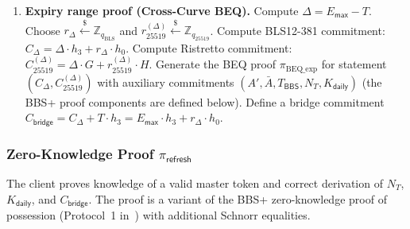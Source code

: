 \documentclass[11pt]{article}
\theoremstyle{definitionstyle}
\theoremstyle{plain}
\begin{document}
\begin{enumerate}[leftmargin=*]
\item \textbf{Expiry range proof (Cross-Curve BEQ).}
  Compute $\Delta = E_{\mathsf{max}} - T$.
  Choose $r_{\Delta} \xleftarrow{\$} \mathbb{Z}_{q_{\text{BLS}}}$ and $r_{25519}^{(\Delta)} \xleftarrow{\$} \mathbb{Z}_{q_{25519}}$.
  Compute BLS12-381 commitment: $C_{\Delta} = \Delta \cdot h_3 + r_{\Delta} \cdot h_0$.
  Compute Ristretto commitment: $C_{25519}^{(\Delta)} = \Delta \cdot G + r_{25519}^{(\Delta)} \cdot H$.
  Generate the BEQ proof $\pi_{\text{BEQ\_exp}}$ for statement $(C_{\Delta}, C_{25519}^{(\Delta)})$ with auxiliary commitments $(A', \bar{A}, T_{\mathsf{BBS}}, N_T, K_{\mathsf{daily}})$ (the BBS+ proof components are defined below).
  Define a bridge commitment $C_{\mathsf{bridge}} = C_{\Delta} + T \cdot h_3 = E_{\mathsf{max}} \cdot h_3 + r_{\Delta} \cdot h_0$.
\end{enumerate}

\subsubsection{Zero-Knowledge Proof $\pi_{\mathsf{refresh}}$}
The client proves knowledge of a valid master token and correct derivation of $N_T$, $K_{\mathsf{daily}}$, and $C_{\mathsf{bridge}}$. The proof is a variant of the BBS+ zero-knowledge proof of possession (Protocol~1 in~\cite{act}) with additional Schnorr equalities.
\end{document}
